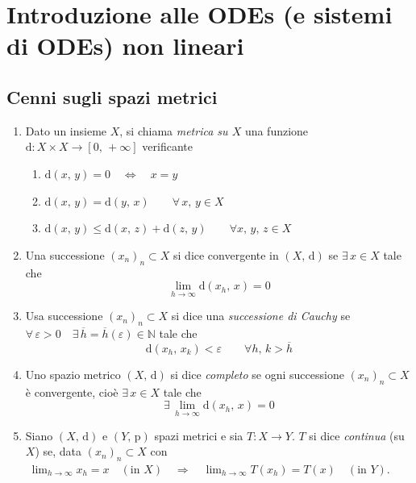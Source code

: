 \graphicspath{{04_ODEs/figures/PNG/}{04_ODEs/figures/PDF/}{04_ODEs/figures/}}


\chapter{Introduzione alle ODEs (e sistemi di ODEs) non lineari}
\copyrightnotice
\section{Cenni sugli spazi metrici}
\begin{definition}
\mbox{}
\begin{enumerate}[labelindent=\parindent,leftmargin=*,label=\textnormal{(\roman*)},start=1]
\item Dato un insieme $X$, si chiama \emph{metrica su $X$} una funzione $\mathrm{d} : X \times X \longrightarrow [0,\,+\infty]$ verificante
	\begin{enumerate}[labelindent=\parindent,leftmargin=*,label=\textnormal{(d\arabic*)},start=1]
	\item $\mathrm{d}(x,\,y) = 0 \quad\Longleftrightarrow\quad x=y$
	\item $\mathrm{d}(x,\,y) = \mathrm{d}(y,\,x) \qquad \forall \, x,\,y \in X$
	\item $\mathrm{d}(x,\,y) \leq \mathrm{d}(x,\,z) + \mathrm{d}(z,\,y) \qquad \forall x,\,y,\,z \in X$
	\end{enumerate}
\item Una successione $(x_n)_n \subset X$ si dice convergente in $(X,\,\mathrm{d})$ se $\exists \, x \in X$ tale che
$$
\lim_{h \rightarrow \infty} \mathrm{d}(x_h,\,x) = 0
$$
\item Usa successione $(x_n)_n \subset X$ si dice una \emph{successione di Cauchy} se $\forall \, \varepsilon > 0 \quad \exists \, \overline{h} = \overline{h}(\varepsilon) \in \mathbb{N}$ tale che
$$
\mathrm{d}(x_h,\,x_k) < \varepsilon \qquad \forall h,\,k > \overline{h}
$$
\item Uno spazio metrico $(X,\,\mathrm{d})$ si dice \emph{completo} se ogni successione $(x_n)_n \subset X$ è convergente, cioè $\exists \, x \in X$ tale che
$$
\exists \, \lim_{h \rightarrow \infty} \mathrm{d}(x_h,\,x) = 0
$$
\item Siano $(X,\,\mathrm{d})$ e $(Y,\,\mathrm{p})$ spazi metrici e sia $T : X \longrightarrow Y$. $T$ si dice \emph{continua} (su $X$) se, data $(x_n)_n \subset X$ con $\; \displaystyle \lim_{h \rightarrow \infty} x_h = x \quad (\text{in } X) \quad\Longrightarrow\quad \lim_{h \rightarrow \infty} T(x_h) = T(x) \quad (\text{in } Y)$.
\end{enumerate}
\end{definition}


